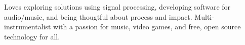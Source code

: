 \documentclass[letter,10pt]{article}
\begin{document}


Loves exploring solutions using signal processing, developing software for audio/music, and being thougtful about process and impact. Multi-instrumentalist with a passion for music, video games, and free, open source technology for all.
\end{document}
